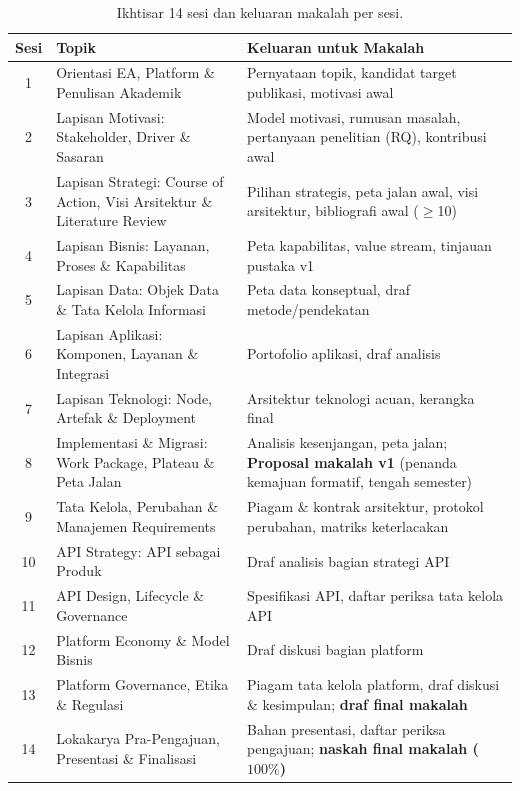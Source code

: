 \begin{table}[htbp]
\centering
\scriptsize
\caption{Ikhtisar 14 sesi dan keluaran makalah per sesi.}
\label{tab:linimasa-sesi}
\begin{tabularx}{\textwidth}{@{}c X X@{}}
\hline
\textbf{Sesi} & \textbf{Topik} & \textbf{Keluaran untuk Makalah} \\
\hline
1  & Orientasi EA, Platform \& Penulisan Akademik & Pernyataan topik, kandidat target publikasi, motivasi awal \\
2  & Lapisan Motivasi: Stakeholder, Driver \& Sasaran & Model motivasi, rumusan masalah, pertanyaan penelitian (RQ), kontribusi awal \\
3  & Lapisan Strategi: Course of Action, Visi Arsitektur \& Literature Review & Pilihan strategis, peta jalan awal, visi arsitektur, bibliografi awal ($\geq$10) \\
4  & Lapisan Bisnis: Layanan, Proses \& Kapabilitas & Peta kapabilitas, value stream, tinjauan pustaka v1 \\
5  & Lapisan Data: Objek Data \& Tata Kelola Informasi & Peta data konseptual, draf metode/pendekatan \\
6  & Lapisan Aplikasi: Komponen, Layanan \& Integrasi & Portofolio aplikasi, draf analisis \\
7  & Lapisan Teknologi: Node, Artefak \& Deployment & Arsitektur teknologi acuan, kerangka final \\
8  & Implementasi \& Migrasi: Work Package, Plateau \& Peta Jalan & Analisis kesenjangan, peta jalan; \textbf{Proposal makalah v1} (penanda kemajuan formatif, tengah semester) \\
9  & Tata Kelola, Perubahan \& Manajemen Requirements & Piagam \& kontrak arsitektur, protokol perubahan, matriks keterlacakan \\
10 & API Strategy: API sebagai Produk & Draf analisis bagian strategi API \\
11 & API Design, Lifecycle \& Governance & Spesifikasi API, daftar periksa tata kelola API \\
12 & Platform Economy \& Model Bisnis & Draf diskusi bagian platform \\
13 & Platform Governance, Etika \& Regulasi & Piagam tata kelola platform, draf diskusi \& kesimpulan; \textbf{draf final makalah} \\
14 & Lokakarya Pra-Pengajuan, Presentasi \& Finalisasi & Bahan presentasi, daftar periksa pengajuan; \textbf{naskah final makalah ($100\%$)} \\
\hline
\end{tabularx}
\end{table}

